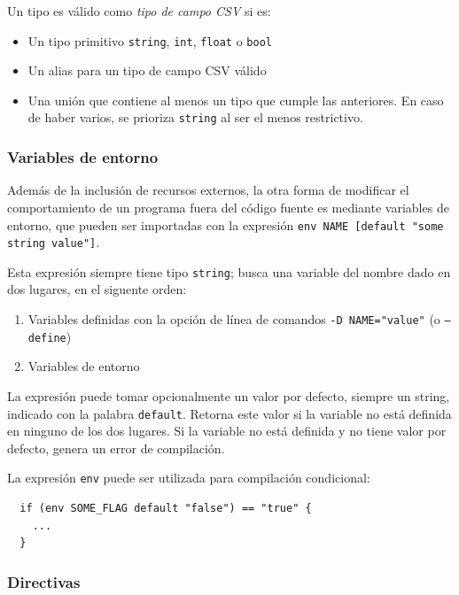 Un tipo es válido como \textit{tipo de campo CSV} si es:

\begin{itemize}
	\item Un tipo primitivo \texttt{string}, \texttt{int}, \texttt{float} o \texttt{bool}
	\item Un alias para un tipo de campo CSV válido
	\item Una unión que contiene al menos un tipo que cumple las anteriores. En caso de haber varios, se prioriza \texttt{string} al ser el menos restrictivo.
\end{itemize}

\subsubsection{Variables de entorno}

Además de la inclusión de recursos externos, la otra forma de modificar el comportamiento de un programa fuera del código fuente es mediante variables de entorno, que pueden ser importadas con la expresión \texttt{env NAME [default "some string value"]}.

Esta expresión siempre tiene tipo \texttt{string}; busca una variable del nombre dado en dos lugares, en el siguente orden:

\begin{enumerate}
	\item Variables definidas con la opción de línea de comandos \texttt{-D NAME="value"} (o \texttt{--define})
	\item Variables de entorno
\end{enumerate}

La expresión puede tomar opcionalmente un valor por defecto, siempre un string, indicado con la palabra \texttt{default}. Retorna este valor si la variable no está definida en ninguno de los dos lugares. Si la variable no está definida y no tiene valor por defecto, genera un error de compilación.

La expresión \texttt{env} puede ser utilizada para compilación condicional:

\small
\begin{verbatim}
  if (env SOME_FLAG default "false") == "true" {
    ...
  }
\end{verbatim}
\normalsize

\subsubsection{Directivas}

